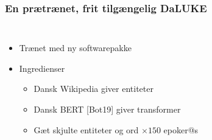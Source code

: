 \documentclass{beamer}
\begin{document}
\begin{frame}
    \frametitle{En prætrænet, frit tilgængelig DaLUKE}
    \begin{columns}
        \begin{itemize}
            \item Trænet med ny softwarepakke
            \item Ingredienser
                \begin{itemize}
                    \item Dansk Wikipedia giver entiteter
                    \item Dansk BERT [Bot19] giver transformer
                    \item Gæt skjulte entiteter og ord $\times 150$ epoker@s
                \end{itemize}
        \end{itemize}

        \begin{figure}[H]
            \centering
            
        \end{figure}\noindent
        \begin{example}
            \footnotesize
            \begin{overlayarea}{\textwidth}{1cm}
            \end{overlayarea}
        \end{example}
    \end{columns}
\end{frame}
\end{document}
